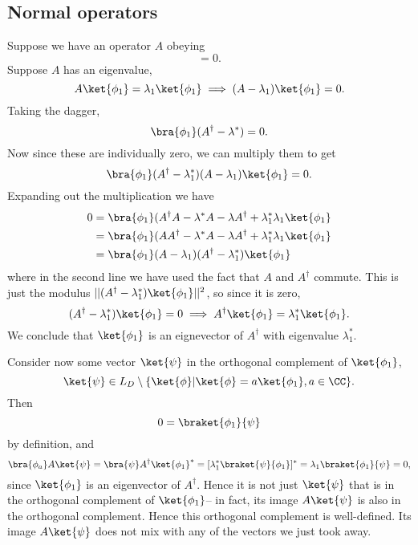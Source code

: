 \subsection*{Normal operators}
Suppose we have an operator $A$ obeying
\begin{equation}
    [A,A^\dagger]=0.
\end{equation}
Suppose $A$ has an eigenvalue,
\begin{equation}
    A \ket{\phi_1} =\lambda_1 \ket{\phi_1} \implies (A-\lambda_1) \ket{\phi_1}=0.
\end{equation}
Taking the dagger,
\begin{equation}
    \bra{\phi_1}(A^\dagger - \lambda^*)=0.
\end{equation}
Now since these are individually zero, we can multiply them to get
\begin{equation}
    \bra{\phi_1}(A^\dagger -\lambda_1^*) (A-\lambda_1) \ket{\phi_1}=0.
\end{equation}
Expanding out the multiplication we have
\begin{align*}
    0 &= \bra{\phi_1} (A^\dagger A - \lambda^* A - \lambda A^\dagger +\lambda_1^* \lambda_1 \ket{\phi_1}\\
    &=\bra{\phi_1} (A A^\dagger - \lambda^* A - \lambda A^\dagger +\lambda_1^* \lambda_1 \ket{\phi_1}\\
    &= \bra{\phi_1}(A -\lambda_1) (A^\dagger-\lambda_1^*) \ket{\phi_1}
\end{align*}
where in the second line we have used the fact that $A$ and $A^\dagger$ commute. This is just the modulus $||(A^\dagger -\lambda_1^*)\ket{\phi_1}||^2$, so since it is zero,
\begin{equation}
    (A^\dagger -\lambda_1^*)\ket{\phi_1}=0 \implies A^\dagger \ket{\phi_1} = \lambda_1^* \ket{\phi_1}.
\end{equation}
We conclude that $\ket{\phi_1}$ is an eignevector of $A^\dagger$ with eigenvalue $\lambda_1^*$.

Consider now some vector $\ket{\psi}$ in the orthogonal complement of $\ket{\phi_1}$, 
\begin{equation}
    \ket{\psi} \in L_D \setminus \set{\ket{\phi}| \ket{\phi}=a\ket{\phi_1},a\in \CC}.
\end{equation}
Then
\begin{equation}
    0=\braket{\phi_1}{\psi}
\end{equation}
by definition, and
\begin{equation}
    \bra{\phi_a}A \ket{\psi} = \bra{\psi} A^\dagger \ket{\phi_1}^* = [\lambda_1^* \braket{\psi}{\phi_1}]^* = \lambda_1 \braket{\phi_1}{\psi}=0,
\end{equation}
since $\ket{\phi_1}$ is an eigenvector of $A^\dagger$. Hence it is not just $\ket{\psi}$ that is in the orthogonal complement of $\ket{\phi_1}$-- in fact, its image $A\ket{\psi}$ is also in the orthogonal complement. Hence this orthogonal complement is well-defined. Its image $A\ket{\psi}$ does not mix with any of the vectors we just took away.

